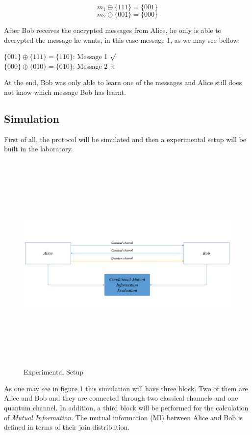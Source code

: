 $$m_{1} \oplus{} \{ 1 1 1 \} = \{ 0 0 1\}$$
$$m_{2} \oplus{} \{ 0 0 1 \} = \{ 0 0 0\}$$

After Bob receives the encrypted messages from Alice, he only is able to decrypted the message he wants, in this case message 1, as we may see bellow:
\begin{center}
$\{ 0 0 1\} \oplus{} \{ 1 1 1\} = \{ 1 1 0\} $: Message 1 $\surd$ \\
$\{ 0 0 0\} \oplus{} \{ 0 1 0\} = \{ 0 1 0\} $: Message 2 $\times$ \\
\end{center}

At the end, Bob was only able to learn one of the messages and Alice still does not know which message Bob has learnt.

\subsection{Simulation}

First of all, the protocol will be simulated and then a experimental setup will be built in the laboratory.

\begin{figure}[H]
	\centering
	\includegraphics[width=1.0\textwidth, height=11cm]{./sdf/ot_with_discrete_variables/figures/SetupOt.png}
	\caption{Experimental Setup}\label{experimentalsetup}
\end{figure}

As one may see in figure \ref{experimentalsetup} this simulation will have three block. Two of them are Alice and Bob and they are connected through two classical channels and one quantum channel. In addition, a third block will be performed for the calculation of \textit{Mutual Information}. The mutual information (MI) between Alice and Bob is defined in terms of their join distribution.

